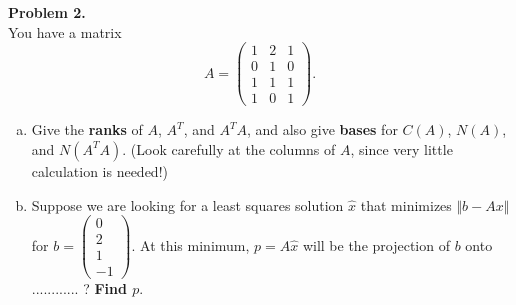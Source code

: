\documentclass[11pt]{article}
\begin{document}
\noindent \textbf{Problem 2.}\\
You have a matrix
$$A = \begin{pmatrix} 1 & 2 & 1 \\ 0 & 1 & 0 \\ 1 & 1 & 1 \\ 1 & 0 & 1 \end{pmatrix}.$$
\begin{enumerate}[(a)]
\item Give the \textbf{ranks} of $A$, $A^T$, and $A^TA$, and also give \textbf{bases} for $C(A)$, $N(A)$, and $N(A^TA)$. (Look carefully at the columns of $A$, since very little calculation is needed!)
\item Suppose we are looking for a least squares solution $\hat{x}$ that minimizes $\Vert b- Ax\Vert$ for $b=\begin{pmatrix} 0 \\ 2 \\ 1 \\ -1 \end{pmatrix}$. At this minimum, $p=A\hat{x}$ will be the projection of $b$ onto ............ ? \textbf{Find $p$}.
\end{enumerate}

\
\end{document}
